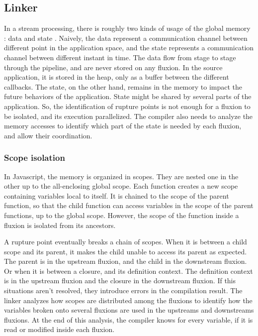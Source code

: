 \subsection{Linker} \label{section:compiler:linker}

In a stream processing, there is roughly two kinds of usage of the global memory : data and state \cite{Fernandez2014a}.
Naively, the data represent a communication channel between different point in the application space, and the state represents a communication channel between different instant in time.
The data flow from stage to stage through the pipeline, and are never stored on any fluxion. In the source application, it is stored in the heap, only as a buffer between the different callbacks.
The state, on the other hand, remains in the memory to impact the future behaviors of the application.
State might be shared by several parts of the application.
So, the identification of rupture points is not enough for a fluxion to be isolated, and its execution parallelized.
The compiler also needs to analyze the memory accesses to identify which part of the state is needed by each fluxion, and allow their coordination.

\subsubsection{Scope isolation}

In Javascript, the memory is organized in scopes.
They are nested one in the other up to the all-enclosing global scope.
Each function creates a new scope containing variables local to itself.
It is chained to the scope of the parent function, so that the child function can access variables in the scope of the parent functions, up to the global scope.
However, the scope of the function inside a fluxion is isolated from its ancestors.

A rupture point eventually breaks a chain of scopes.
When it is between a child scope and its parent, it makes the child unable to access its parent as expected.
The parent is in the upstream fluxion, and the child in the downstream fluxion.
Or when it is between a closure, and its definition context.
The definition context is in the upstream fluxion and the closure in the downstream fluxion.
If this situations aren't resolved, they introduce errors in the compilation result.
The linker analyzes how scopes are distributed among the fluxions to identify how the variables broken onto several fluxions are used in the upstreams and downstreams fluxions.
At the end of this analysis, the compiler knows for every variable, if it is read or modified inside each fluxion.

